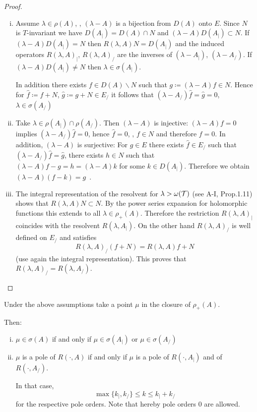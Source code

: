 \begin{proof}
\begin{enumerate}[(i), wide]
\item 
Assume $\lambda \in \rho(A)$, \ie, $(\lambda-A)$ is a bijection from $D(A)$ onto $E$.
Since $N$ is $T$-invariant we have $D(A_{|}) = D(A) \cap N$ and $(\lambda-A)D(A_{|}) \subset N$.
If $(\lambda-A)D(A_{|}) = N$ then $R(\lambda,A)N = D(A_{|})$ and the induced operators $R(\lambda,A)_{|}$, \resp $R(\lambda,A)_{/}$ are the inverses of $(\lambda-A_{|})$, \resp $(\lambda-A_{/})$.
If $(\lambda-A)D(A_{|}) \neq N$ then $\lambda \in \sigma(A_{|})$.

In addition there exists $f \in D(A)\backslash N$ such that $g \coloneqq (\lambda-A)f \in N$.
Hence for $\hat{f} \coloneqq f+N$, $\hat{g} \coloneqq g+N \in E_{/}$ it follows that $(\lambda-A_{/})\hat{f} = \hat{g} = 0$, \ie $\lambda \in \sigma(A_{/})$

\item 
Take $\lambda \in \rho(A_{|}) \cap \rho(A_{/})$.
Then $(\lambda-A)$ is injective: $(\lambda-A)f = 0$ implies $(\lambda-A_{/})\hat{f}= 0$, hence $\hat{f} = 0$, \ie, $f \in N$ and therefore $f = 0$.
In addition, $(\lambda-A)$ is surjective: For $g \in E$ there exists $\hat{f} \in E_{/}$ such that $(\lambda-A_{/})\hat{f} = \hat{g}$, \ie there exists $h \in N$ such that $(\lambda-A)f - g = h = (\lambda-A)k$ for some $k \in D(A_{|})$.
Therefore we obtain $(\lambda-A)(f-k) = g$~.

\item 
The integral representation of the resolvent for $\lambda > \omega(\mathcal{T})$ (see A-I, Prop.1.11) shows that $R(\lambda,A)N \subset N$.
By the power series expansion for holomorphic functions this extends to all $\lambda \in \rho_{+}(A)$.
Therefore the restriction $R(\lambda,A)_{|}$ coincides with the resolvent $R(\lambda,A_{|})$.
On the other hand $R(\lambda,A)_{/}$ is well defined on $E_{/}$ and satisfies
\[
R(\lambda,A)_{/}(f+N) = R(\lambda,A)f + N
\]
(use again the integral representation).
This proves that $R(\lambda,A)_{/} = R(\lambda,A_{/})$.
\end{enumerate}
\end{proof}
\begin{corollary}\label{cor:a3-4.3}

Under the above assumptions take a point $\mu$ in the closure of $\rho_{+}(A)$.

Then:
\begin{enumerate}[(i)]
\item 
$\mu \in \sigma(A)$ if and only if $\mu \in \sigma(A_{|})$ or $\mu \in \sigma(A_{/})$

\item 
$\mu$ is a pole of $R(\cdot,A)$ if and only if $\mu$ is a pole of $R(\cdot,A_{|})$ and of $R(\cdot,A_{/})$.

In that case,
\[
\max\{k_{|},k_{/}\} \leq k \leq k_{|} + k_{/}
\]
for the respective pole orders. Note that hereby pole orders $0$ are allowed.
\end{enumerate}
\end{corollary}

